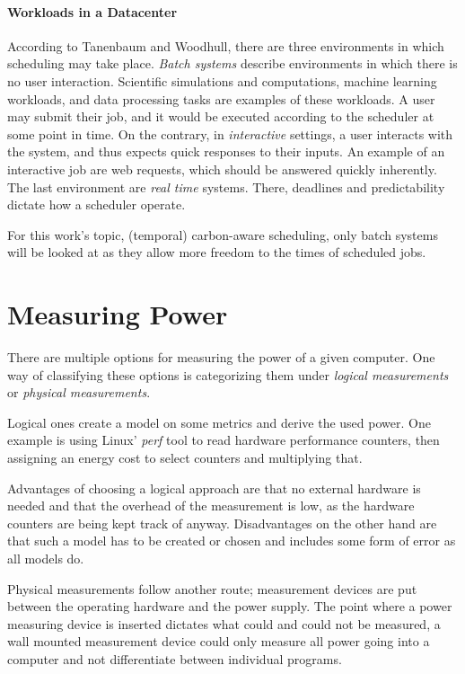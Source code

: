 \paragraph{Workloads in a Datacenter} According to Tanenbaum and Woodhull\cite{tanenbaum_operating_2006}, there are three environments in which scheduling may take place. \emph{Batch systems} describe environments in which there is no user interaction. 
Scientific simulations and computations, machine learning workloads, and data processing tasks are examples of these workloads\cite{sukprasert_limitations_2024}.
A user may submit their job, and it would be executed according to the scheduler at some point in time. 
On the contrary, in \emph{interactive} settings, a user interacts with the system, and thus expects quick responses to their inputs. An example of an interactive job are web requests, which should be answered quickly inherently.
The last environment are \emph{real time} systems. There, deadlines and predictability dictate how a scheduler operate.

For this work's topic, (temporal) carbon-aware scheduling, only batch systems will be looked at as they allow more freedom to the times of scheduled jobs.

\section{Measuring Power}

There are multiple options for measuring the power of a given computer. One way of classifying these options is categorizing them under \emph{logical measurements} or \emph{physical measurements}.

Logical ones create a model on some metrics and derive the used power. One example is using Linux' \emph{perf} tool to read hardware performance counters, then assigning an energy cost to select counters and multiplying that. 

Advantages of choosing a logical approach are that no external hardware is needed and that the overhead of the measurement is low, as the hardware counters are being kept track of anyway. 
Disadvantages on the other hand are that such a model has to be created or chosen and includes some form of error as all models do.

Physical measurements follow another route; measurement devices are put between the operating hardware and the power supply. 
The point where a power measuring device is inserted dictates what could and could not be measured, a wall mounted measurement device could only measure all power going into a computer and not differentiate between individual programs.

